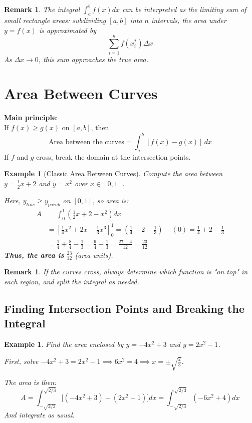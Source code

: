\documentclass[12pt]{article}
\newtheorem{example}[definition]{Example}
\newtheorem{remark}[definition]{Remark}
\begin{document}
\begin{remark}
The integral $\int_a^b f(x)dx$ can be interpreted as the limiting sum of small rectangle areas: subdividing $[a,b]$ into $n$ intervals, the area under $y=f(x)$ is approximated by
\[
\sum_{i=1}^n f(x_i^*) \Delta x
\]
As $\Delta x \to 0$, this sum approaches the true area.
\end{remark}

\section{Area Between Curves}

\textbf{Main principle}:\\
If $f(x) \geq g(x)$ on $[a,b]$, then
\[
\text{Area between the curves} = \int_a^b [f(x) - g(x)]\, dx
\]
If $f$ and $g$ cross, break the domain at the intersection points.

\begin{example}[Classic Area Between Curves]
Compute the area between $y = \frac{1}{2}x + 2$ and $y = x^2$ over $x \in [0,1]$.

Here, $y_{line} \geq y_{parab}$ on $[0,1]$, so area is:
\begin{align*}
A &= \int_0^1 \left( \frac{1}{2} x + 2 - x^2 \right) dx\\
&= \left[ \frac{1}{4}x^2 + 2x - \frac{1}{3}x^3 \right]_0^1
= \left( \frac{1}{4} + 2 - \frac{1}{3} \right) - (0) 
= \frac{1}{4} + 2 - \frac{1}{3}\\
&= \frac{1}{4} + \frac{8}{4} - \frac{1}{3} = \frac{9}{4} - \frac{1}{3} = \frac{27-4}{12} = \frac{23}{12}
\end{align*}
\textbf{Thus, the area is} $\boxed{\frac{23}{12}}$ (area units).
\end{example}

\begin{remark}
If the curves cross, always determine which function is "on top" in each region, and split the integral as needed.
\end{remark}

\subsection{Finding Intersection Points and Breaking the Integral}

\begin{example}
Find the area enclosed by $y = -4x^2 + 3$ and $y = 2x^2 - 1$.

First, solve $-4x^2 + 3 = 2x^2 - 1 \implies 6x^2 = 4 \implies x = \pm \sqrt{\frac{2}{3}}$.

The area is then:
\[
A = \int_{-\sqrt{2/3}}^{\sqrt{2/3}} \big[(-4x^2 + 3) - (2x^2 - 1)\big] dx
= \int_{-\sqrt{2/3}}^{\sqrt{2/3}} (-6x^2 + 4) dx
\]
And integrate as usual.
\end{example}
\end{document}
